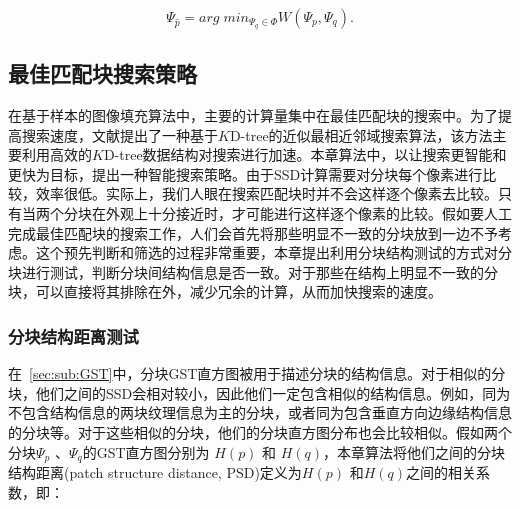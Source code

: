  $$\Psi_{\hat{p}}=arg\;min_{\Psi_q \in \Phi}{W(\Psi_p,\Psi_q)}.$$

 \subsection{最佳匹配块搜索策略}
 在基于样本的图像填充算法中，主要的计算量集中在最佳匹配块的搜索中。为了提高搜索速度，文献\cite{kwokFast}提出了一种基于$K$D-tree的近似最相近邻域搜索算法，该方法主要利用高效的$K$D-tree数据结构对搜索进行加速。本章算法中，以让搜索更智能和更快为目标，提出一种智能搜索策略。由于SSD计算需要对分块每个像素进行比较，效率很低。实际上，我们人眼在搜索匹配块时并不会这样逐个像素去比较。只有当两个分块在外观上十分接近时，才可能进行这样逐个像素的比较。假如要人工完成最佳匹配块的搜索工作，人们会首先将那些明显不一致的分块放到一边不予考虑。这个预先判断和筛选的过程非常重要，本章提出利用分块结构测试的方式对分块进行测试，判断分块间结构信息是否一致。对于那些在结构上明显不一致的分块，可以直接将其排除在外，减少冗余的计算，从而加快搜索的速度。
 \subsubsection{分块结构距离测试}
 \label{sec:sub:PST}
 在~\ref{sec:sub:GST}中，分块GST直方图被用于描述分块的结构信息。对于相似的分块，他们之间的SSD会相对较小，因此他们一定包含相似的结构信息。例如，同为不包含结构信息的两块纹理信息为主的分块，或者同为包含垂直方向边缘结构信息的分块等。对于这些相似的分块，他们的分块直方图分布也会比较相似。假如两个分块\(\Psi_p\) 、\(\Psi_q\)的GST直方图分别为 \(H(p)\) 和 \(H(q)\)，本章算法将他们之间的分块结构距离(patch structure distance, PSD)定义为\(H(p)\) 和\(H(q)\)之间的相关系数，即：

